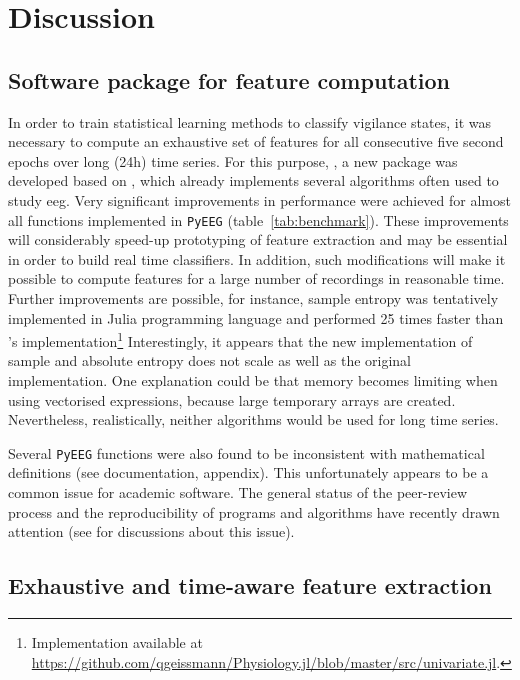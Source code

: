 \section{Discussion} \label{discussion}

\subsection{Software package for feature computation}
 
In order to train statistical learning methods to classify vigilance states,
it was necessary to compute an exhaustive set of features for all consecutive five second epochs
over long (24h) time series.
For this purpose, \pr{}, a new \py{} package was developed based on
\pyeeg\cite{bao_pyeeg:_2011},  which already implements several
algorithms often used to study \gls{eeg}.
Very significant improvements in performance were achieved for almost all functions implemented in \texttt{PyEEG}
(table~\ref{tab:benchmark}). These improvements will considerably speed-up prototyping of feature extraction
and may be essential in order to build real time classifiers.
In addition, such modifications will make it possible to compute features for a large number
of recordings in reasonable time.
Further improvements are possible, for instance,
sample entropy was tentatively implemented in Julia programming language\cite{bezanson_julia:_2012}
and performed 25 times faster than \pr{}'s implementation\footnote{Implementation available at
\href{https://github.com/qgeissmann/Physiology.jl/blob/master/src/univariate.jl}{https://github.com/qgeissmann/Physiology.jl/blob/master/src/univariate.jl}.}
Interestingly, it appears that the new implementation of sample and
absolute entropy does not scale as well as the original implementation.
One explanation could be that memory becomes limiting when using vectorised expressions, because large temporary arrays are created.
Nevertheless, realistically, neither algorithms would be used for long time series.

Several \texttt{PyEEG} functions were also found to be inconsistent with mathematical
definitions (see \pr{} documentation, appendix).
This unfortunately appears to be a common issue for academic software.
The general status of the peer-review process and the reproducibility of programs and algorithms have
recently drawn attention (see \cite{morin_shining_2012,crick_can_2014} for
discussions about this issue).

\subsection{Exhaustive and time-aware feature extraction}

